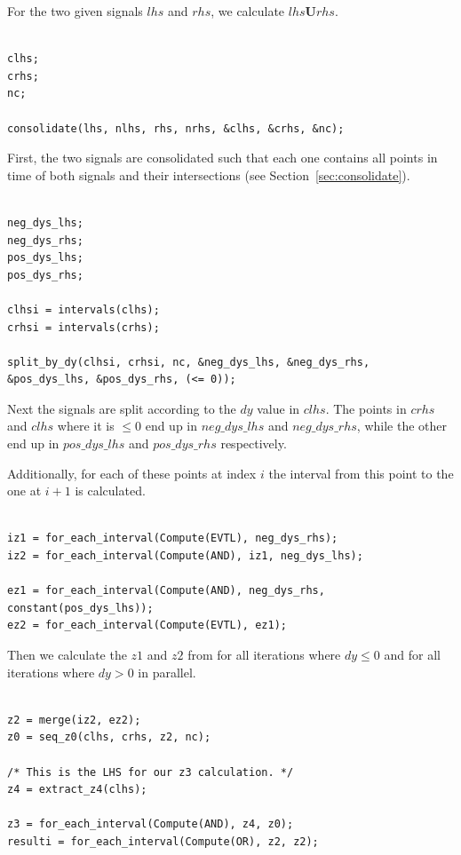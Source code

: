 \documentclass[a4paper,10pt]{article}
\newcommand{\Until}{\mathbf{U}}
\begin{document}
For the two given signals $lhs$ and $rhs$, we calculate $lhs \Until rhs$.

\begin{lstlisting}

clhs;
crhs;
nc;

consolidate(lhs, nlhs, rhs, nrhs, &clhs, &crhs, &nc);

\end{lstlisting}

First, the two signals are consolidated such that each one contains all points in
time of both signals and their intersections (see Section~\ref{sec:consolidate}).

\begin{lstlisting}

neg_dys_lhs;
neg_dys_rhs;
pos_dys_lhs;
pos_dys_rhs;

clhsi = intervals(clhs);
crhsi = intervals(crhs);

split_by_dy(clhsi, crhsi, nc, &neg_dys_lhs, &neg_dys_rhs, &pos_dys_lhs, &pos_dys_rhs, (<= 0));

\end{lstlisting}

Next the signals are split according to the $dy$ value in $clhs$. The points in
$crhs$ and $clhs$ where it is $\leq 0$ end up in $neg\_dys\_lhs$ and $neg\_dys\_rhs$,
while the other end up in $pos\_dys\_lhs$ and $pos\_dys\_rhs$ respectively.

Additionally, for each of these points at index $i$ the interval from this point to
the one at $i+1$ is calculated.

\begin{lstlisting}

iz1 = for_each_interval(Compute(EVTL), neg_dys_rhs);
iz2 = for_each_interval(Compute(AND), iz1, neg_dys_lhs);

ez1 = for_each_interval(Compute(AND), neg_dys_rhs, constant(pos_dys_lhs));
ez2 = for_each_interval(Compute(EVTL), ez1);

\end{lstlisting}

Then we calculate the $z1$ and $z2$ from for all iterations where $dy \leq 0$ and for
all iterations where $dy > 0$ in parallel.

\begin{lstlisting}

z2 = merge(iz2, ez2);
z0 = seq_z0(clhs, crhs, z2, nc);

/* This is the LHS for our z3 calculation. */
z4 = extract_z4(clhs);

z3 = for_each_interval(Compute(AND), z4, z0);
resulti = for_each_interval(Compute(OR), z2, z2);

\end{lstlisting}
\end{document}
